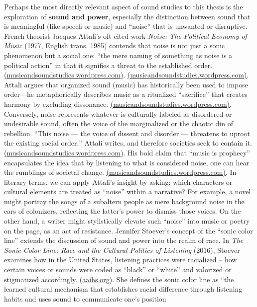 \documentclass[12pt]{report}
\begin{document}
Perhaps the most directly relevant aspect of sound studies to this thesis is the exploration of \textbf{sound and power}, especially the distinction between sound that is meaningful (like speech or music) and “noise” that is unwanted or disruptive. French theorist Jacques Attali’s oft-cited work \textit{Noise: The Political Economy of Music} (1977, English trans. 1985) contends that noise is not just a sonic phenomenon but a social one: “the mere naming of something as noise is a political action” in that it signifies a threat to the established order. \href{https://musicandsoundstudies.wordpress.com/2014/03/03/noise-pt-2-attali/#:~:text=This%20noise%20%E2%80%94%20the%20voice,As%20Attali}{(musicandsoundstudies.wordpress.com)}. \href{https://musicandsoundstudies.wordpress.com/2014/03/03/noise-pt-2-attali/#:~:text=boundaries%2C%20it%20literally%20,As%20he%20concisely}{(musicandsoundstudies.wordpress.com)}. Attali argues that organized sound (music) has historically been used to impose order—he metaphorically describes music as a ritualized “sacrifice” that creates harmony by excluding dissonance. \href{https://musicandsoundstudies.wordpress.com/2014/03/03/noise-pt-2-attali/#:~:text=To%20explain%20music%20as%20the,audible%20to%20the%20perceptive%20ear}{(musicandsoundstudies.wordpress.com)}. Conversely, noise represents whatever is culturally labeled as disordered or undesirable sound, often the voice of the marginalized or the chaotic din of rebellion. “This noise — the voice of dissent and disorder — threatens to uproot the existing social order,” Attali writes, and therefore societies seek to contain it. \href{https://musicandsoundstudies.wordpress.com/2014/03/03/noise-pt-2-attali/#:~:text=This%20noise%20%E2%80%94%20the%20voice,As%20Attali}{(musicandsoundstudies.wordpress.com)}. His bold claim that “music is prophecy” encapsulates the idea that by listening to what is considered noise, one can hear the rumblings of societal change. \href{https://musicandsoundstudies.wordpress.com/2014/03/03/noise-pt-2-attali/#:~:text=This%20noise%20%E2%80%94%20the%20voice,As%20Attali}{(musicandsoundstudies.wordpress.com)}. In literary terms, we can apply Attali’s insight by asking: which characters or cultural elements are treated as “noise” within a narrative? For example, a novel might portray the songs of a subaltern people as mere background noise in the ears of colonizers, reflecting the latter’s power to dismiss those voices. On the other hand, a writer might stylistically elevate such “noise” into music or poetry on the page, as an act of resistance. Jennifer Stoever’s concept of the “sonic color line” extends the discussion of sound and power into the realm of race. In \textit{The Sonic Color Line: Race and the Cultural Politics of Listening} (2016), Stoever examines how in the United States, listening practices were racialized – how certain voices or sounds were coded as “black” or “white” and valorized or stigmatized accordingly. \href{https://www.aaihs.org/the-sonic-color-line-black-women-and-police-violence/#:~:text=aural%20border%20between%20white%20people,call%20the%20sonic%20color%20line}{(aaihs.org)}. She defines the sonic color line as “the learned cultural mechanism that establishes racial difference through listening habits and uses sound to communicate one’s position 
\end{document}
